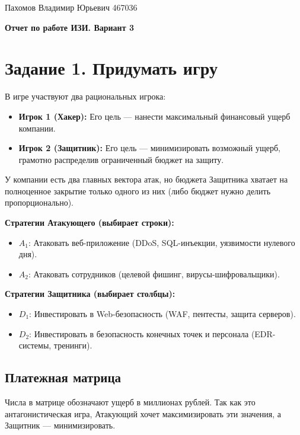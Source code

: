 \documentclass[a4paper,12pt]{article}
\begin{document}
\begin{flushleft}
    Пахомов Владимир Юрьевич 467036 \\
\end{flushleft}

\begin{center}
    \LARGE \textbf{Отчет по работе ИЗИ. Вариант 3} \\
\end{center}


\section*{Задание 1. Придумать игру}

В игре участвуют два рациональных игрока:
\begin{itemize}
    \item \textbf{Игрок 1 (Хакер):} Его цель — нанести максимальный финансовый ущерб компании.
    \item \textbf{Игрок 2 (Защитник):} Его цель — минимизировать возможный ущерб, грамотно распределив ограниченный бюджет на защиту.
\end{itemize}

У компании есть два главных вектора атак, но бюджета Защитника хватает на полноценное закрытие только одного из них (либо бюджет нужно делить пропорционально).

\textbf{Стратегии Атакующего (выбирает строки):}
\begin{itemize}
    \item $A_1$: Атаковать веб-приложение (DDoS, SQL-инъекции, уязвимости нулевого дня).
    \item $A_2$: Атаковать сотрудников (целевой фишинг, вирусы-шифровальщики).
\end{itemize}

\textbf{Стратегии Защитника (выбирает столбцы):}
\begin{itemize}
    \item $D_1$: Инвестировать в Web-безопасность (WAF, пентесты, защита серверов).
    \item $D_2$: Инвестировать в безопасность конечных точек и персонала (EDR-системы, тренинги).
\end{itemize}

\subsection*{Платежная матрица}
Числа в матрице обозначают ущерб в миллионах рублей. Так как это антагонистическая игра, Атакующий хочет максимизировать эти значения, а Защитник — минимизировать.
\end{document}
